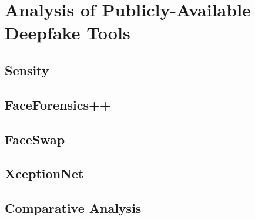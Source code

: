 
\chapter{Analysis of Publicly-Available Deepfake Tools}\label{chapter:tools}

\section{Sensity}\label{chapter:sensity}
\section{FaceForensics++}\label{chapter:faceforensics}
\section{FaceSwap}\label{chapter:faceswap}
\section{XceptionNet}\label{chapter:xceptionnet}
\section{Comparative Analysis}\label{chapter:analysis} 